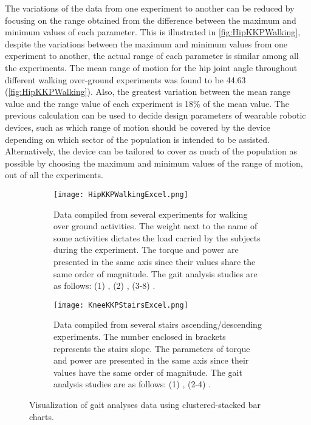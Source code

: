 The variations of the data from one experiment to another can be reduced by focusing on the range obtained from the difference between the maximum and minimum values of each parameter. This is illustrated in \autoref{fig:HipKKPWalking}, despite the variations between the maximum and minimum values from one experiment to another, the actual range of each parameter is similar among all the experiments. The mean range of motion for the hip joint angle throughout different walking over-ground experiments was found to be 44.63\degree{} (\autoref{fig:HipKKPWalking}). Also, the greatest variation between the mean range value and the range value of each experiment is 18\% of the mean value. The previous calculation can be used to decide design parameters of wearable robotic devices, such as which range of motion should be covered by the device depending on which sector of the population is intended to be assisted. Alternatively, the device can be tailored to cover as much of the population as possible by choosing the maximum and minimum values of the range of motion, out of all the experiments. 
\begin{figure}[htbp]
    \centering
    \begin{subfigure}[b]{0.75\textwidth}
        \centering
        \texttt{[image: HipKKPWalkingExcel.png]}
        \caption{Data compiled from several experiments for walking over ground activities. The weight next to the name of some activities dictates the load carried by the subjects during the experiment. The torque and power are presented in the same axis since their values share the  same order of magnitude. The gait analysis studies are as follows: (1) \cite{bovi2011multiple}, (2) \cite{lee2008biomechanics}, (3-8) \cite{han2011biomechanical}. }
        \label{fig:HipKKPWalking}
    \end{subfigure}
    \hfill
    \begin{subfigure}[b]{0.75\textwidth}
        \centering
        \texttt{[image: KneeKKPStairsExcel.png]}
        \caption{Data compiled from several stairs ascending/descending experiments. The number
        enclosed in brackets represents the stairs slope. The parameters of torque and power are presented in the same axis since their values have the same order of magnitude. The gait analysis studies are as follows: (1) \cite{riener2002stair}, (2-4) \cite{reid2007knee}. }
        \label{fig:KneeKKPWalking}
    \end{subfigure}
    \caption{Visualization of gait analyses data using clustered-stacked bar charts. }
    \label{fig:clusteredMain}
\end{figure}

